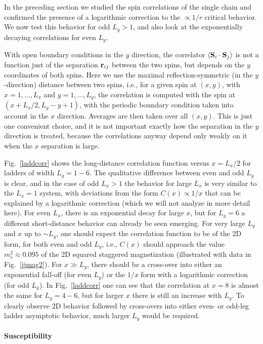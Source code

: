 \documentclass[draft,numberedheadings]{aipproc}
\begin{document}
In the preceding section we studied the spin correlations of the single chain and confirmed the presence of a logarithmic correction to the $\propto 1/r$ 
critical behavior. We now test this behavior for odd $L_y>1$, and also look at the exponentially decaying correlations for even $L_y$. 

With open boundary conditions in the $y$ direction, the correlator $\langle {\bf S}_i \cdot {\bf S}_j\rangle$ is not a function just of the separation 
${\bf r}_{ij}$ between the two spins, but depends on the $y$ coordinates of both spins. Here we use the maximal reflection-symmetric (in the $y$-direction) distance 
between two spins, i.e., for a given spin at $(x,y)$, with $x=1,\ldots,L_x$ and $y=1,\ldots,L_y$, the correlation is computed with the spin at $(x+L_x/2,L_y-y+1)$, 
with the periodic boundary condition taken into account in the $x$ direction. Averages are then taken over all $(x,y)$. This is just one convenient choice, 
and it is not important exactly how the separation in the $y$ direction is treated, because the correlations anyway depend only weakly on it when the $x$ separation 
is large.

Fig.~\ref{laddcorr} shows the long-distance correlation function versus $x=L_x/2$ for ladders of width $L_y=1-6$. The qualitative difference between even
and odd $L_y$ is clear, and in the case of odd $L_x>1$ the behavior for large $L_x$ is very similar to the $L_x=1$ system, with deviations from the
form $C(x) \propto 1/x$ that can be explained by a logarithmic correction (which we will not analyze in more detail here). For even $L_x$, there is
an exponential decay for large $x$, but for $L_y=6$ a different short-distance behavior can already be seen emerging. For very large $L_y$ and $x$ up to $\sim L_y$,
one should expect the correlation function to be of the 2D form, for both even and odd $L_y$, i.e., $C(x)$ should approach the value $m_s^2 \approx 0.095$ 
of the 2D squared staggered magnetization (illustrated with data in Fig.~\ref{jjmag2}). For $x\gg L_y$, there should be a cross-over into either an exponential 
fall-off (for even $L_y$) or the $1/x$ form with a logarithmic correction (for odd $L_y$). In Fig.~\ref{laddcorr} one can see that the correlation at
$x=8$ is almost the same for $L_y=4-6$, but for larger $x$ there is still an increase with $L_y$. To clearly observe 2D behavior followed by cross-overs 
into either even- or odd-leg ladder asymptotic behavior, much larger $L_y$ would be required.

\paragraph{Susceptibility}
\end{document}
